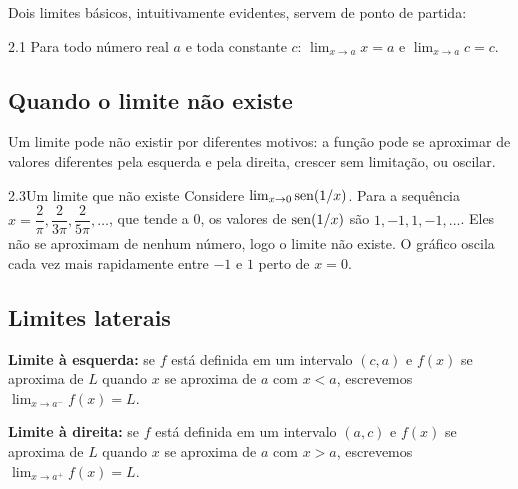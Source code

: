 Dois limites básicos, intuitivamente evidentes, servem de ponto de partida:

\begin{teorema}{2.1}
Para todo número real $a$ e toda constante $c$:
\qquad $\displaystyle\lim_{x\to a}x=a$ \qquad e \qquad $\displaystyle\lim_{x\to a}c=c$.
\end{teorema}

\subsection{Quando o limite não existe}

Um limite pode não existir por diferentes motivos: a função pode se aproximar de valores
diferentes pela esquerda e pela direita, crescer sem limitação, ou oscilar.

\begin{exemplo}{2.3}{Um limite que não existe}
Considere $\lim_{x\to0}\operatorname{sen}(1/x)$. Para a sequência $x=\dfrac2\pi,\dfrac2{3\pi},
\dfrac2{5\pi},\dots$, que tende a 0, os valores de $\operatorname{sen}(1/x)$ são $1,-1,1,-1,\dots$. Eles não
se aproximam de nenhum número, logo o limite não existe. O gráfico oscila cada vez mais
rapidamente entre $-1$ e $1$ perto de $x=0$.
\end{exemplo}

\subsection{Limites laterais}

\begin{definicao}
\textbf{Limite à esquerda:} se $f$ está definida em um intervalo $(c,a)$ e $f(x)$ se
aproxima de $L$ quando $x$ se aproxima de $a$ com $x<a$, escrevemos
$\displaystyle\lim_{x\to a^-}f(x)=L$.

\textbf{Limite à direita:} se $f$ está definida em um intervalo $(a,c)$ e $f(x)$ se
aproxima de $L$ quando $x$ se aproxima de $a$ com $x>a$, escrevemos
$\displaystyle\lim_{x\to a^+}f(x)=L$.
\end{definicao}

